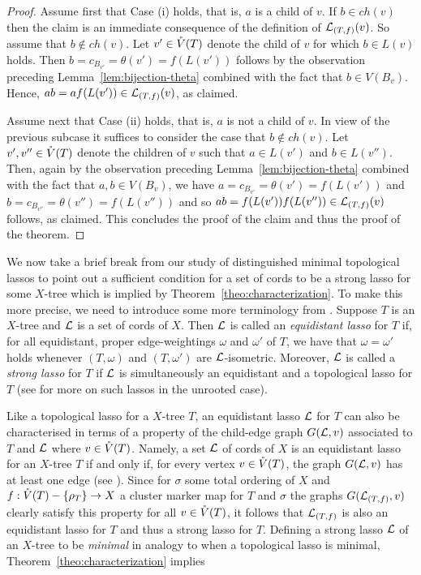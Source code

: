 \begin{proof}
Assume first that Case (i) holds, that is, $a$ is a child of $v$.  If $b\in
ch(v)$ then the claim is an immediate consequence of the definition of
${\mathcal L}_{(T,f)}(v)$. So assume that $b\not\in ch(v)$. Let $v'\in \mathring{V}(T)$ denote
the child of $v$ for which $b\in L(v)$ holds. Then
$b=c_{B_{v'}}=\theta(v')=f(L(v'))$ follows by the observation preceding
Lemma~\ref{lem:bijection-theta} combined with the fact that $b\in
V(B_v)$. Hence, $ab=af(L(v'))\in {\mathcal L}_{(T,f)}(v)$, as claimed.

Assume next that Case (ii) holds, that is, $a$ is not a child of $v$.  In view
of the previous subcase it suffices to consider the case that $b\not\in
ch(v)$. Let $v',v''\in \mathring{V}(T)$ denote the children of $v$ such that $a\in
L(v')$ and $b\in L(v'')$.  Then, again by the observation preceding
Lemma~\ref{lem:bijection-theta} combined with the fact that $a,b\in V(B_v)$,
we have $a=c_{B_{v'}}=\theta(v')=f(L(v'))$ and
$b=c_{B_{v''}}=\theta(v'')=f(L(v''))$ and so $ab=f(L(v'))f(L(v''))\in
{\mathcal L}_{(T,f)}(v)$ follows, as claimed.  This concludes the proof of the claim
and thus the proof of the theorem.
\end{proof}

We now take a brief break from our study of distinguished minimal topological
lassos to point out a sufficient condition for a set of cords to be a strong
lasso for some $X$-tree which is implied by
Theorem~\ref{theo:characterization}. To make this more precise, we need to
introduce some more terminology from \cite{HP13}. Suppose $T$ is an $X$-tree
and ${\mathcal L}$ is a set of cords of $X$.  Then ${\mathcal L}$ is called an {\em equidistant
  lasso} for $T$ if, for all equidistant, proper edge-weightings $\omega$ and
$\omega'$ of $T$, we have that $\omega=\omega'$ holds whenever $(T,\omega)$
and $(T,\omega')$ are ${\mathcal L}$-isometric. Moreover, ${\mathcal L}$ is called a {\em strong
  lasso} for $T$ if ${\mathcal L}$ is simultaneously an equidistant and a topological
lasso for $T$ (see \cite{DHS11} for more on such lassos in the unrooted case).

Like a topological lasso for a $X$-tree $T$, an equidistant lasso ${\mathcal L}$ for
$T$ can also be characterised in terms of a property of the child-edge graph
$G({\mathcal L},v)$ associated to $T$ and ${\mathcal L}$ where $v\in \mathring{V}(T)$. Namely, a set
${\mathcal L}$ of cords of $X$ is an equidistant lasso for an $X$-tree $T$ if and only
if, for every vertex $v\in \mathring{V}(T)$, the graph $G({\mathcal L},v)$ has at least one edge
(see \cite[Theorem 6.1]{HP13}).  Since for $\sigma$ some total ordering of $X$
and $f:\mathring{V}(T)-\{\rho_T\}\to X$ a cluster marker map for $T$ and $\sigma$ the
graphs $G({\mathcal L}_{(T,f)},v)$ clearly satisfy this property for all $v\in \mathring{V}(T)$,
it follows that ${\mathcal L}_{(T,f)}$ is also an equidistant lasso for $T$ and thus a
strong lasso for $T$. Defining a strong lasso ${\mathcal L}$ of an $X$-tree to be {\em
  minimal} in analogy to when a topological lasso is minimal,
Theorem~\ref{theo:characterization} implies



